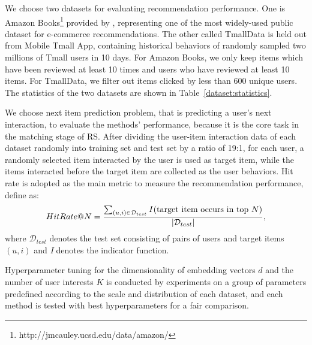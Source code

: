 \documentclass[sigconf]{acmart}
\begin{document}
We choose two datasets for evaluating recommendation performance.
One is Amazon Books\footnote{http://jmcauley.ucsd.edu/data/amazon/} provided by \cite{he2016ups,mcauley2015image}, representing one of the most widely-used public dataset for e-commerce recommendations.
The other called TmallData is held out from Mobile Tmall App, containing historical behaviors of randomly sampled two millions of Tmall users in 10 days.
For Amazon Books, we only keep items which have been reviewed at least 10 times and users who have reviewed at least 10 items.
For TmallData, we filter out items clicked by less than 600 unique users.
The statistics of the two datasets are shown in Table~\ref{dataset:statistics}.

We choose next item prediction problem, that is predicting a user's next interaction, to evaluate the methods' performance, because it is the core task in the matching stage of RS.
After dividing the user-item interaction data of each dataset randomly into training set and test set by a ratio of 19:1, for each user, a randomly selected item interacted by the user is used as target item, while the items interacted before the target item are collected as the user behaviors.
Hit rate is adopted as the main metric to measure the recommendation performance, define as:
\begin{equation}
  HitRate@N = \frac{ \sum_{(u,i)\in \mathcal{D}_{test}} \emph{I}\,(\text{target item occurs in top } N) }{|\mathcal{D}_{test}|},
\end{equation}
where $\mathcal{D}_{test}$ denotes the test set consisting of pairs of users and target items $(u,i)$ and \emph{I} denotes the indicator function.

Hyperparameter tuning for the dimensionality of embedding vectors $d$ and the number of user interests $K$ is conducted by experiments on a group of parameters predefined according to the scale and distribution of each dataset, and each method is tested with best hyperparameters for a fair comparison.
\end{document}
